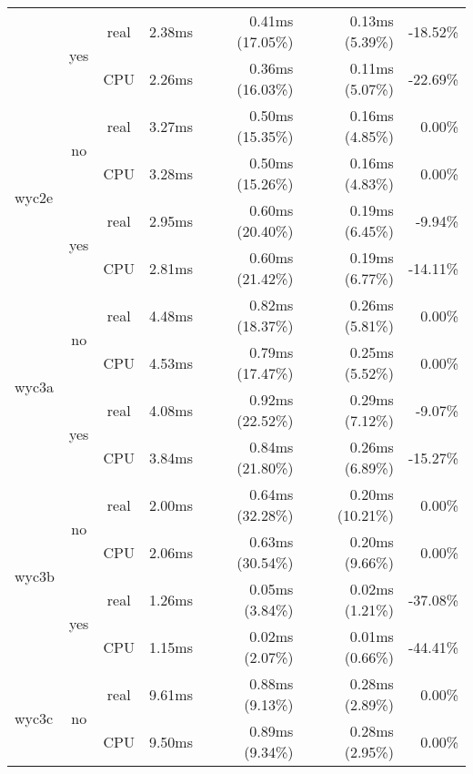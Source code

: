 \documentclass[en]{pracamgr}
\begin{document}
\begin{appendices}
\begin{small}
\begin{longtable}{|l|c|c|r|r|r|r|}
                          \cline{2-7}
                          & \multirow{2}{*}{yes} & real & 2.38ms & 0.41ms (17.05\%) & 0.13ms (5.39\%) & -18.52\% \\*
                          &                      & CPU  & 2.26ms & 0.36ms (16.03\%) & 0.11ms (5.07\%) & -22.69\% \\
\hline
\multirow{4}{*}{wyc2e}    & \multirow{2}{*}{no}  & real & 3.27ms & 0.50ms (15.35\%) & 0.16ms (4.85\%) & 0.00\% \\*
                          &                      & CPU  & 3.28ms & 0.50ms (15.26\%) & 0.16ms (4.83\%) & 0.00\% \\*
                          \cline{2-7}
                          & \multirow{2}{*}{yes} & real & 2.95ms & 0.60ms (20.40\%) & 0.19ms (6.45\%) & -9.94\% \\*
                          &                      & CPU  & 2.81ms & 0.60ms (21.42\%) & 0.19ms (6.77\%) & -14.11\% \\
\hline
\multirow{4}{*}{wyc3a}    & \multirow{2}{*}{no}  & real & 4.48ms & 0.82ms (18.37\%) & 0.26ms (5.81\%) & 0.00\% \\*
                          &                      & CPU  & 4.53ms & 0.79ms (17.47\%) & 0.25ms (5.52\%) & 0.00\% \\*
                          \cline{2-7}
                          & \multirow{2}{*}{yes} & real & 4.08ms & 0.92ms (22.52\%) & 0.29ms (7.12\%) & -9.07\% \\*
                          &                      & CPU  & 3.84ms & 0.84ms (21.80\%) & 0.26ms (6.89\%) & -15.27\% \\
\hline
\multirow{4}{*}{wyc3b}    & \multirow{2}{*}{no}  & real & 2.00ms & 0.64ms (32.28\%) & 0.20ms (10.21\%) & 0.00\% \\*
                          &                      & CPU  & 2.06ms & 0.63ms (30.54\%) & 0.20ms (9.66\%) & 0.00\% \\*
                          \cline{2-7}
                          & \multirow{2}{*}{yes} & real & 1.26ms & 0.05ms (3.84\%) & 0.02ms (1.21\%) & -37.08\% \\*
                          &                      & CPU  & 1.15ms & 0.02ms (2.07\%) & 0.01ms (0.66\%) & -44.41\% \\
\hline
\multirow{4}{*}{wyc3c}    & \multirow{2}{*}{no}  & real & 9.61ms & 0.88ms (9.13\%) & 0.28ms (2.89\%) & 0.00\% \\*
                          &                      & CPU  & 9.50ms & 0.89ms (9.34\%) & 0.28ms (2.95\%) & 0.00\% \\*

\end{longtable}
\end{small}
\end{appendices}
\end{document}
